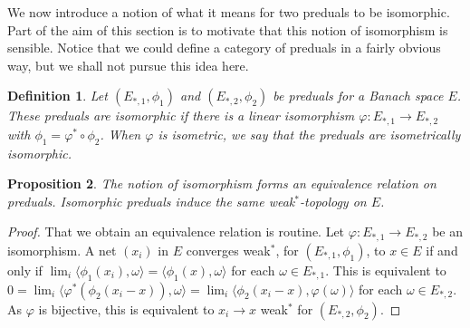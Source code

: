\documentclass[a4paper,11pt]{article}
\theoremstyle{plain}
\newtheorem{proposition}{Proposition}[section]
\newtheorem{definition}[proposition]{Definition}
\theoremstyle{remark}
\newcommand{\ip}[2]{{\langle {#1} , {#2} \rangle}}
\begin{document}
We now introduce a notion of what it means for two preduals to be isomorphic.  Part of the aim of this section is to motivate that this notion of isomorphism is sensible.  Notice that we could define a category of preduals in a fairly obvious way, but we shall not pursue this idea here.

\begin{definition}
Let $(E_{*,1}, \phi_1)$ and $(E_{*,2}, \phi_2)$ be preduals for a Banach space $E$.  These preduals are \emph{isomorphic} if there is a linear isomorphism $\varphi \colon E_{*,1} \to E_{*,2}$ with $\phi_1 = \varphi^* \circ \phi_2$.  When $\varphi$ is isometric, we say that the preduals are \emph{isometrically isomorphic}.
\end{definition}

\begin{proposition}\label{prop:what_im_means_predual}
The notion of isomorphism forms an equivalence relation on preduals.  Isomorphic preduals induce the same weak$^*$-topology on $E$.
\end{proposition}
\begin{proof}
That we obtain an equivalence relation is routine.  Let $\varphi \colon E_{*,1} \to E_{*,2}$ be an isomorphism.  A net $(x_i)$ in $E$ converges weak$^*$, for $(E_{*,1}, \phi_1)$, to $x\in E$ if and only if $\lim_i \ip{\phi_1(x_i)}{\omega} = \ip{\phi_1(x)}{\omega}$ for each $\omega \in E_{*,1}$.  This is equivalent to $0 = \lim_i \ip{\varphi^*(\phi_2(x_i-x))}{\omega} = \lim_i \ip{\phi_2(x_i-x)}{\varphi(\omega)}$ for each $\omega\in E_{*,2}$.  As $\varphi$ is bijective, this is equivalent to $x_i \to x$ weak$^*$ for $(E_{*,2}, \phi_2)$.
\end{proof}
\end{document}
